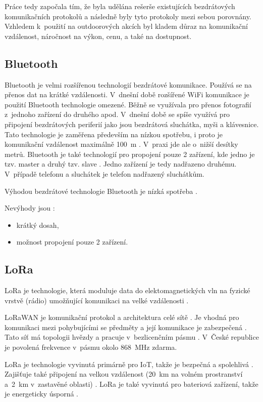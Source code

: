 Práce tedy započala tím, že byla udělána rešerše existujících bezdrátových komunikačních protokolů a následně byly tyto protokoly 
mezi sebou porovnány. Vzhledem k~použití na outdoorových akcích byl kladem důraz na komunikační vzdálenost, náročnost na výkon, cenu, 
a také na dostupnost. 

\subsection{Bluetooth}
Bluetooth je velmi rozšířenou technologií bezdrátové komunikace. Používá se na přenos dat na krátké vzdálenosti. V~dnešní době 
rozšířené WiFi komunikace je použití Bluetooth technologie omezené. Běžně se využívala pro přenos fotografií z~jednoho zařízení do druhého apod. V~dnešní 
době se spíše využívá pro připojení bezdrátových periferií jako jsou bezdrátová sluchátka, myši a klávesnice. Tato technologie je zaměřena 
především na nízkou spotřebu, i proto je komunikační vzdálenost maximálně 100~m \cite{Bezdrat_muni}. V~praxi jde ale o~nižší desítky
metrů. Bluetooth je také technologií pro propojení pouze 2 zařízení, kde jedno je tzv. master a druhý tzv. slave \cite{Bezdrat_muni}. 
Jedno zařízení je tedy nadřazeno druhému. V~případě telefonu a sluchátek je telefon nadřazený sluchátkům. 

Výhodou bezdrátové technologie Bluetooth je nízká spotřeba \cite{Bezdrat_muni}.

Nevýhody jsou \cite{Bezdrat_muni}:
\begin{itemize}
  \item krátký dosah,
  \item možnost propojení pouze 2 zařízení.
\end{itemize}

\subsection{LoRa}
LoRa je technologie, která moduluje data do elektomagnetických vln na fyzické vrstvě (rádio) umožňující komunikaci na velké vzdálenosti \cite{LoRa_eman}. 

LoRaWAN je komunikační protokol a architektura celé sítě \cite{LoRa_eman}. Je vhodná pro komunikaci mezi pohybujícími se předměty a její komunikace je 
zabezpečená \cite{LoRa_eman}. Tato síť má topologii hvězdy a pracuje v~bezlicenčním pásmu \cite{LoRa_eman}. V~České republice je povolená frekvence v~pásmu 
okolo 868~MHz zdarma.

LoRa je technologie vyvinutá primárně pro IoT, takže je bezpečná a spolehlivá \cite{LoRa_IoT_PORT}. Zajišťuje také připojení na velkou vzdálenost (20~km na 
volném prostranství a~2~km v~zastavěné oblasti) \cite{LoRa_IoT_PORT}. LoRa je také vyvinutá pro bateriová zařízení, takže je energeticky 
úsporná \cite{LoRa_IoT_PORT}.

